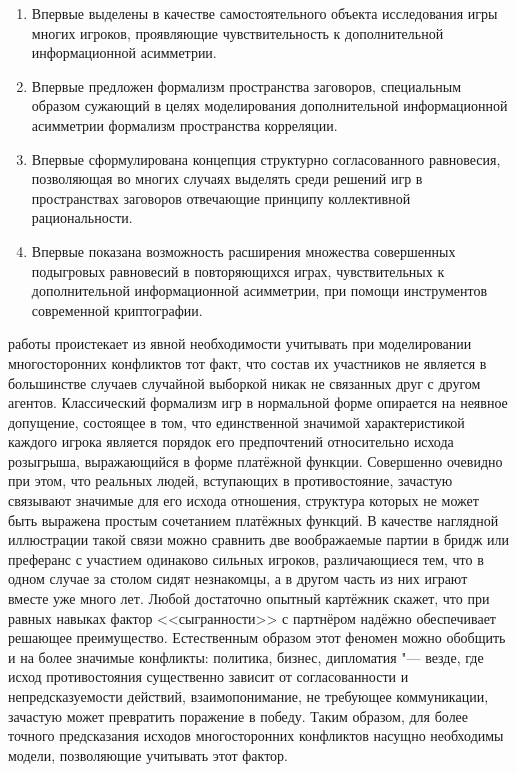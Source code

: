 {\novelty}
\begin{enumerate}[beginpenalty=10000] %
  \item Впервые выделены в качестве самостоятельного объекта исследования игры многих игроков, проявляющие чувствительность к дополнительной информационной асимметрии.
  \item Впервые предложен формализм пространства заговоров, специальным образом сужающий в целях моделирования дополнительной информационной асимметрии формализм пространства корреляции.
  \item Впервые сформулирована концепция структурно согласованного равновесия, позволяющая во многих случаях выделять среди решений игр в пространствах заговоров отвечающие принципу коллективной рациональности.
  \item Впервые показана возможность расширения множества совершенных подыгровых равновесий в повторяющихся играх, чувствительных к дополнительной информационной асимметрии, при помощи инструментов современной криптографии.
\end{enumerate}

{\influence} работы проистекает из явной необходимости учитывать при моделировании многосторонних конфликтов тот факт, что состав их участников не является в большинстве случаев случайной выборкой никак не связанных друг с другом агентов. Классический формализм игр в нормальной форме опирается на неявное допущение, состоящее в том, что единственной значимой характеристикой каждого игрока является порядок его предпочтений относительно исхода розыгрыша, выражающийся в форме платёжной функции. Совершенно очевидно при этом, что реальных людей, вступающих в противостояние, зачастую связывают значимые для его исхода отношения, структура которых не может быть выражена простым сочетанием платёжных функций. \ifsynopsis\else В качестве наглядной иллюстрации такой связи можно сравнить две воображаемые партии в бридж или преферанс с участием одинаково сильных игроков, различающиеся тем, что в одном случае за столом сидят незнакомцы, а в другом часть из них играют вместе уже много лет. Любой достаточно опытный картёжник скажет, что при равных навыках фактор <<сыгранности>> с партнёром надёжно обеспечивает решающее преимущество. Естественным образом этот феномен можно обобщить и на более значимые конфликты: политика, бизнес, дипломатия "--- везде, где исход противостояния существенно зависит от согласованности и непредсказуемости действий, взаимопонимание, не требующее коммуникации, зачастую может превратить поражение в победу. \fi Таким образом, для более точного предсказания исходов многосторонних конфликтов насущно необходимы модели, позволяющие учитывать этот фактор.

